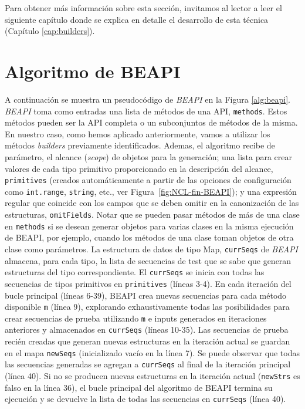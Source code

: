 Para obtener más información sobre esta sección, invitamos al lector a leer el siguiente capítulo donde se explica en detalle el desarrollo de esta técnica (Capítulo \ref{cap:builders}).

\section{Algoritmo de BEAPI}
\label{sec:beapiTechnique}

A continuación se muestra un pseudocódigo de \emph{BEAPI} en la Figura \ref{alg:beapi}. \emph{BEAPI} toma como entradas una lista de métodos de una API,  \texttt{methods}. Estos métodos pueden ser la API completa o un subconjuntos de métodos de la misma. En nuestro caso, como hemos aplicado anteriormente, vamos a utilizar los métodos \emph{builders} previamente identificados. Ademas, el algoritmo recibe de parámetro, el alcance (\emph{scope}) de objetos para la generación; una lista para crear valores de cada tipo primitivo proporcionado en la descripción del alcance, \texttt{primitives} (creados automáticamente a partir de las opciones de configuración como \texttt{int.range}, \texttt{string}, etc., ver Figura~\ref{fig:NCL-fin-BEAPI}); y una expresión regular que coincide con los campos que se deben omitir en la canonización de las estructuras, \texttt{omitFields}. Notar que se pueden pasar métodos de más de una clase en \texttt{methods} si se desean generar objetos para varias clases en la misma ejecución de \textsf{BEAPI}, por ejemplo, cuando los métodos de una clase toman objetos de otra clase como parámetros. La estructura de datos de tipo Map, \texttt{currSeqs} de \emph{BEAPI}  almacena, para cada tipo, la lista de secuencias de test que se sabe que generan estructuras del tipo correspondiente. El \texttt{currSeqs} se inicia con todas las secuencias de tipos primitivos en \texttt{primitives} (líneas 3-4). En cada iteración del bucle principal (líneas 6-39), \textsf{BEAPI}  crea nuevas secuencias para cada método disponible \texttt{m} (línea 9), explorando exhaustivamente todas las posibilidades para crear secuencias de prueba utilizando \texttt{m} e inputs generados en iteraciones anteriores y almacenados en \texttt{currSeqs} (líneas 10-35). Las secuencias de prueba recién creadas que generan nuevas estructuras en la iteración actual se guardan en el mapa \texttt{newSeqs} (inicializado vacío en la línea 7). Se puede observar que todas las secuencias generadas se agregan a \texttt{currSeqs} al final de la iteración principal (línea 40). Si no se producen nuevas estructuras en la iteración actual (\texttt{newStrs} es falso en la línea 36), el bucle principal del algoritmo de  \textsf{BEAPI}  termina su ejecución y se devuelve la lista de todas las secuencias en \texttt{currSeqs} (línea 40).


